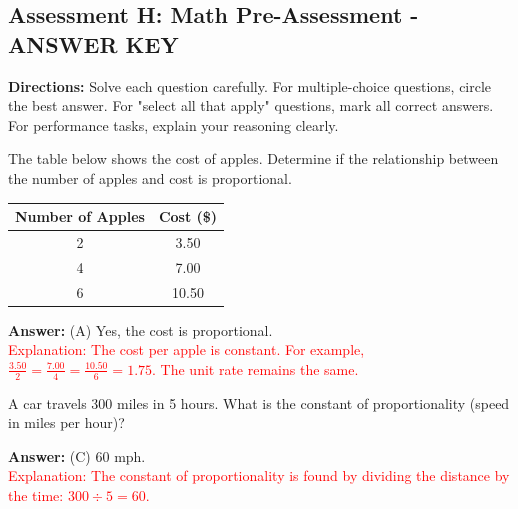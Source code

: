 \documentclass[12pt]{article}
\begin{document}
\subsection*{Assessment H: Math Pre-Assessment - ANSWER KEY}
\onehalfspacing

\begin{tcolorbox}[colframe=black!50, colback=white, title=Assessment Directions]
\textbf{Directions:} Solve each question carefully. For multiple-choice questions, circle the best answer. For "select all that apply" questions, mark all correct answers. For performance tasks, explain your reasoning clearly.
\end{tcolorbox}

\begin{tcolorbox}[colframe=black!50, colback=white, title=\textbf{Problem 1 (7.RP.A.2a)}]
The table below shows the cost of apples. Determine if the relationship between the number of apples and cost is proportional.\\

\begin{center}
\begin{tabular}{|c|c|}
\hline
Number of Apples & Cost (\$) \\
\hline
2 & 3.50 \\
4 & 7.00 \\
6 & 10.50 \\
\hline
\end{tabular}
\end{center}

\textbf{Answer:} (A) Yes, the cost is proportional.\\
\textcolor{red}{Explanation: The cost per apple is constant. For example, \(\frac{3.50}{2} = \frac{7.00}{4} = \frac{10.50}{6} = 1.75\). The unit rate remains the same.}
\end{tcolorbox}

\begin{tcolorbox}[colframe=black!50, colback=white, title=\textbf{Problem 2 (7.RP.A.2b)}]
A car travels 300 miles in 5 hours. What is the constant of proportionality (speed in miles per hour)?

\textbf{Answer:} (C) 60 mph.\\
\textcolor{red}{Explanation: The constant of proportionality is found by dividing the distance by the time: \(300 \div 5 = 60\).}
\end{tcolorbox}
\end{document}

